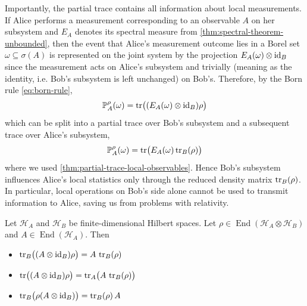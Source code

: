 \begin{example}
Importantly, the partial trace contains all information about local measurements.
If Alice performs a measurement corresponding to an observable $A$ on her subsystem and \(E_A\) denotes its spectral measure from \autoref{thm:spectral-theorem-unbounded}, then the event that Alice's measurement outcome lies in a Borel set \(\omega \subseteq \sigma(A)\) is represented on the joint system by the projection
\(
E_A(\omega)\otimes \operatorname{id}_B
\)
since the measurement acts on Alice's subsystem and 
trivially (meaning as the identity, i.e. Bob's subsystem is left unchanged) 
on Bob's.
Therefore, by the Born rule \eqref{eq:born-rule},
\[
\operatorname{\mathbb{P}}_A^{\rho}(\omega)
=
\operatorname{tr}\bigl((E_A(\omega)\otimes \operatorname{id}_B)\rho\bigr)
\]
which can be split into a partial trace over Bob's subsystem and a subsequent trace over Alice's subsystem,
\[
\operatorname{\mathbb{P}}_A^{\rho}(\omega)
=
\operatorname{tr}\bigl(E_A(\omega)\operatorname{tr}_B(\rho)\bigr)
\]
where we used \autoref{thm:partial-trace-local-observables}.
Hence Bob's subsystem influences Alice's local statistics only through the reduced density matrix \(\operatorname{tr}_B(\rho)\).
In particular, local operations on Bob's side alone cannot be used to transmit information to Alice, saving us from problems with relativity.
\end{example}


\begin{theorem}\label{thm:partial-trace-local-observables}
Let $\mathcal H_A$ and $\mathcal H_B$ be finite-dimensional Hilbert spaces.
Let
\(
\rho \in \operatorname{End}(\mathcal H_A \otimes \mathcal H_B)
\) and
\(
A \in \operatorname{End}(\mathcal H_A)
\).
Then
\begin{itemize}
\item
\(
\operatorname{tr}_B\bigl((A\otimes \operatorname{id}_B)\rho\bigr)
=
A\,\operatorname{tr}_B(\rho)
\)
\item
\(
\operatorname{tr}\bigl((A\otimes \operatorname{id}_B)\rho\bigr)
=
\operatorname{tr}_A\bigl(A\,\operatorname{tr}_B(\rho)\bigr)
\)
\item
\(
\operatorname{tr}_B\bigl(\rho(A\otimes \operatorname{id}_B)\bigr)
=
\operatorname{tr}_B(\rho)\,A 
\)
\qedhere
\end{itemize}
\end{theorem}



























